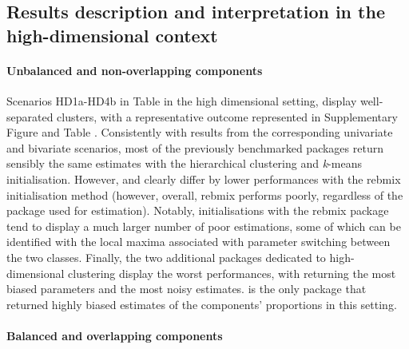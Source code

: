 \subsection{Results description and interpretation in the high-dimensional context}
\label{results-description-and-interpretation-in-the-high-dimensional-context}

\paragraph{Unbalanced and non-overlapping components}

Scenarios HD1a-HD4b in Table  in the high dimensional setting, display well-separated clusters, with a representative outcome represented in Supplementary Figure  and Table . Consistently with results from the corresponding univariate and bivariate scenarios, most of the previously benchmarked packages return sensibly the same estimates with the hierarchical clustering and \emph{k}-means initialisation. However,  and  clearly differ by lower performances with the rebmix initialisation method (however, overall, rebmix performs poorly, regardless of the package used for estimation). Notably, initialisations with the rebmix package tend to display a much larger number of poor estimations, some of which can be identified with the local maxima associated with parameter switching between the two classes. Finally, the two additional packages dedicated to high-dimensional clustering display the worst performances, with  returning the most biased parameters and  the most noisy estimates.  is the only package that returned highly biased estimates of the components' proportions in this setting.

\paragraph{Balanced and overlapping components}

